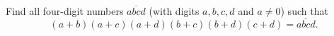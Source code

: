 Find all four-digit numbers $\overline{abcd}$ (with digits $a,b,c,d$ and $a\ne0$) such that
\[
(a+b)(a+c)(a+d)(b+c)(b+d)(c+d)=\overline{abcd}.
\]
